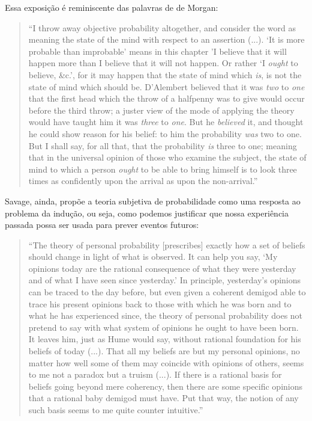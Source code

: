 Essa exposição é reminiscente das palavras de de Morgan:

\begin{quote}
``I throw away objective probability altogether, and consider the word as meaning the state of the mind with respect to an 
assertion (...). `It is more probable than improbable' means in this chapter 'I believe that it will happen more than I 
believe that it will not happen. Or rather `I {\em ought} to believe, \&c.', for it may happen that the state of mind which {\em
is}, is not the state of mind which should be. 
D'Alembert believed that it was {\em two} to {\em one} that the first head which the throw of a halfpenny was to give would occur
before the third throw; a juster view of the mode of applying the theory would have taught him it was {\em three} to {\em one}.
But he {\em believed} it, and thought he could show reason for his belief: to him the probability {\em was} two to one. But 
I shall say, for all that, that the probability {\em is} three to one; meaning that in the universal opinion of those who
examine the subject, the state of mind to which a person {\em ought} to be able to bring himself is to look three times
as confidently upon the arrival as upon the non-arrival.''\citep{deMorgan1847}
\end{quote}

Savage, ainda, propõe a teoria subjetiva de probabilidade como uma resposta ao problema da indução, ou seja,
como podemos justificar que nossa experiência passada possa ser usada para prever eventos futuros:

\begin{quote}
``The theory of personal probability [prescribes] exactly how a set of beliefs should change in light of what is observed.
It can help you say, `My opinions today are the rational consequence of what they were yesterday and of what I have seen
since yesterday.' In principle, yesterday's opinions can be traced to the day before, but even given a coherent demigod
able to trace his present opinions back to those with which he was born and to what he has experienced since, the theory
of personal probability does not pretend to say with what system of opinions he ought to have been born. It leaves him, just
as Hume would say, without rational foundation for his beliefs of today (...). That all my beliefs are but my personal
opinions, no matter how well some of them may coincide with opinions of others, seems to me not a paradox but a truism (...).
If there is a rational basis for beliefs going beyond mere coherency, then there are some specific opinions that a rational
baby demigod must have. Put that way, the notion of any such basis seems to me quite counter intuitive.'' \citep{Savage67}
\end{quote}

